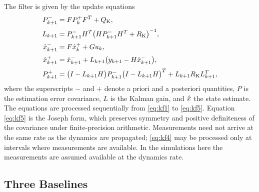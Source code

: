 The filter is given by the update equations
\begin{align}
P_{k+1}^-&=FP_k^+F^T+Q_{\mathrm{K}},\label{eq:kf1}\\[2pt]
L_{k+1}&=P_{k+1}^-H^T\bigl(HP_{k+1}^-H^T+R_{\mathrm{K}}\bigr)^{-1},\label{eq:kf2}\\[2pt]
\hat{x}_{k+1}^-&=F\hat{x}_k^++Gu_k ,\label{eq:kf3}\\[2pt]
\hat{x}_{k+1}^+&=\hat{x}_{k+1}^-+L_{k+1}\bigl(y_{k+1}-H\hat{x}_{k+1}^-\bigr),\label{eq:kf4}\\[2pt]
P_{k+1}^+&=\bigl(I-L_{k+1}H\bigr)P_{k+1}^-\bigl(I-L_{k+1}H\bigr)^T
+L_{k+1}R_{\mathrm{K}}L_{k+1}^T ,\label{eq:kf5}
\end{align}
where the superscripts $-$ and $+$ denote a priori and a posteriori quantities,
$P$ is the estimation error covariance, $L$ is the Kalman gain, and $\hat{x}$ the
state estimate. The equations are processed sequentially from \eqref{eq:kf1} to
\eqref{eq:kf5}. Equation \eqref{eq:kf5} is the Joseph form, which preserves
symmetry and positive definiteness of the covariance under finite-precision
arithmetic. Measurements need not arrive at the same rate as the dynamics are
propagated; \eqref{eq:kf4} may be processed only at intervals where measurements
are available. In the simulations here the measurements are assumed available at
the dynamics rate.

\subsection{Three Baselines}

